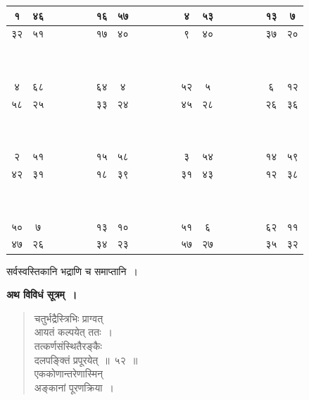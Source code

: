 \documentclass[11pt, openany]{book}
\begin{document}
\begin{table}[h]
\setlength{\extrarowheight}{2pt} \setlength{\tabcolsep}{2pt}	
\centering
\begin{tabular}{|c|c|c|c|c|c|c|c|c|c|c|c|c|c|}
	\hline
१ & ४६ & ~~ & ~~ & १६ & ५७ & ~~ & ~~ & ४ & ५३ & ~~ & ~~ & १३ & ७\\
\hline
३२ & ५१ &  &  & १७ & ४० & ~~ &  &९ & ४० & ~~ & ~~ &३७ & २०\\
\hline
&  & ~~ & ~~ & ~~ & ~~ & ~~ & ~~ & ~~ & ~~ &  & ~~ & ~~ & \\
\hline
&  & ~~ & ~~ & ~~ & ~~ & ~~ & ~~ & ~~ & ~~ &  & ~~ & ~~ & \\
\hline
४ & ६८ & ~~ & ~~ & ६४ & ४ & ~~ & ~~ &५२ & ५ &  & ~~ & ६ & १२ \\
\hline
५८ & २५ & ~~ & ~~ & ३३ & २४ & ~~ & ~~ & ४५ & २८ & ~~ & ~~ & २६ & ३६ \\ 
\hline
&  & ~~ & ~~ & ~~ & ~~ & ~~ & ~~ & ~~ & ~~ &  & ~~ & ~~ & \\
\hline
&  & ~~ & ~~ & ~~ & ~~ & ~~ & ~~ & ~~ & ~~ &  & ~~ & ~~ & \\
\hline
२ & ५१ & ~~ & ~~ & १५ & ५८ & ~~ & ~~ & ३ & ५४ & ~~ & ~~ &१४ & ५९\\
\hline
४२ & ३१ & ~~ & ~~ &१८ & ३९ & ~~ & ~~ & ३१ & ४३ & ~~ & ~~ & १२ & ३८ \\
\hline
&  & ~~ & ~~ & ~~ & ~~ & ~~ & ~~ & ~~ & ~~ &  & ~~ & ~~ & \\
\hline
&  & ~~ & ~~ & ~~ & ~~ & ~~ & ~~ & ~~ & ~~ &  & ~~ & ~~ & \\
\hline
५० & ७ & ~~ & ~~ &१३ & १० & ~~ & ~~ &५१ & ६ & ~~ & ~~ & ६२ & ११\\
\hline
४७ & २६ & ~~ & ~~ & ३४ & २३ & ~~ & ~~ & ५७ & २७ & ~~ & ~~ &३५ & ३२\\
\hline
\end{tabular}
\end{table}

\vspace{-3mm}
\begin{center}
सर्वस्वस्तिकानि भद्राणि च समाप्तानि~।	
\end{center}
\vspace{2mm}

\textbf{अथ विविधं सूत्रम्~।}

\begin{quote}
{\gk चतुर्भद्रैस्त्रिभिः प्राग्वत्\\
आयतं कल्पयेत् ततः~।\\
तत्कर्णसंस्थितैरङ्कैः\\
दलपङ्क्तिं प्रपूरयेत्~॥~५२~॥\\
एककोणान्तरेणास्मिन्\\
अङ्कानां पूरणक्रिया~।}
\end{quote}
\end{document}
